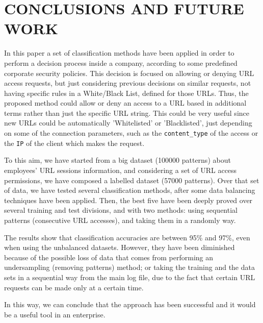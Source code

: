 \documentclass{llncs}
\begin{document}
\section{\uppercase{Conclusions and Future Work}}
\label{sec:conclusions}

\noindent In this paper a set of classification methods have been applied
in order to perform a decision process inside a company, according to
some predefined corporate security policies. 
This decision is focused on allowing or denying URL access requests, but just considering previous decisions on similar requests, not having specific rules in a White/Black List, defined for those URLs. Thus, the proposed method could allow or deny an access to a URL based in additional terms rather than just the specific URL string. This could be very useful since new URLs could be automatically 'Whitelisted' or 'Blacklisted', just depending on some of the connection parameters, such as the \texttt{content\_type} of the access or the \texttt{IP} of the client which makes the request.

To this aim, we have started from a big dataset (100000 patterns) about employees' URL sessions information, and considering a set of URL access permissions, we have composed a labelled dataset (57000 patterns). Over that set of data, we have tested several classification methods, after some data balancing techniques have been applied. Then, the best five have been deeply proved over several training and test divisions, and with two methods: using sequential patterns (consecutive URL accesses), and taking them in a randomly way.

The results show that classification accuracies are between 95\% and 97\%, even when using the unbalanced datasets. However, they have been diminished because of the possible loss of data that comes from performing an undersampling (removing patterns) method; or taking the training and the data sets in a sequential way from the main log file, due to the fact that certain URL requests can be made only at a certain time.

In this way, we can conclude that the approach has been successful and it would be a useful tool in an enterprise.
\end{document}
